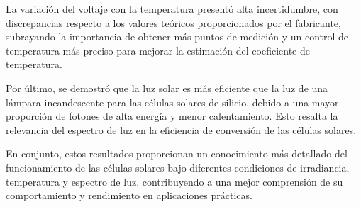 \vspace{\baselineskip}	

La variación del voltaje con la temperatura presentó alta incertidumbre, con discrepancias respecto a los valores teóricos proporcionados por el fabricante, subrayando la importancia de obtener más puntos de medición y un control de temperatura más preciso para mejorar la estimación del coeficiente de temperatura.

\vspace{\baselineskip}	

Por último, se demostró que la luz solar es más eficiente que la luz de una lámpara incandescente para las células solares de silicio, debido a una mayor proporción de fotones de alta energía y menor calentamiento. Esto resalta la relevancia del espectro de luz en la eficiencia de conversión de las células solares.

\vspace{\baselineskip}	

En conjunto, estos resultados proporcionan un conocimiento más detallado del funcionamiento de las células solares bajo diferentes condiciones de irradiancia, temperatura y espectro de luz, contribuyendo a una mejor comprensión de su comportamiento y rendimiento en aplicaciones prácticas.

\clearpage

